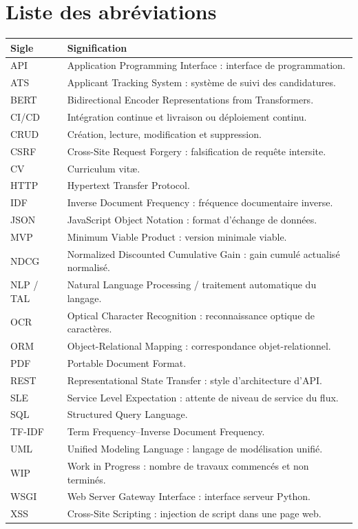 \chapter*{Liste des abréviations}
\begingroup
\small
{}
\begin{longtable}{@{}P{2.5cm}P{11.8cm}@{}}
\toprule\textbf{Sigle} & \textbf{Signification}\\\midrule\endhead
API & Application Programming Interface : interface de programmation.\\
ATS & Applicant Tracking System : système de suivi des candidatures.\\
BERT & Bidirectional Encoder Representations from Transformers.\\
CI/CD & Intégration continue et livraison ou déploiement continu.\\
CRUD & Création, lecture, modification et suppression.\\
CSRF & Cross-Site Request Forgery : falsification de requête intersite.\\
CV & Curriculum vitæ.\\
HTTP & Hypertext Transfer Protocol.\\
IDF & Inverse Document Frequency : fréquence documentaire inverse.\\
JSON & JavaScript Object Notation : format d'échange de données.\\
MVP & Minimum Viable Product : version minimale viable.\\
NDCG & Normalized Discounted Cumulative Gain : gain cumulé actualisé normalisé.\\
NLP / TAL & Natural Language Processing / traitement automatique du langage.\\
OCR & Optical Character Recognition : reconnaissance optique de caractères.\\
ORM & Object-Relational Mapping : correspondance objet-relationnel.\\
PDF & Portable Document Format.\\
REST & Representational State Transfer : style d'architecture d'API.\\
SLE & Service Level Expectation : attente de niveau de service du flux.\\
SQL & Structured Query Language.\\
TF-IDF & Term Frequency--Inverse Document Frequency.\\
UML & Unified Modeling Language : langage de modélisation unifié.\\
WIP & Work in Progress : nombre de travaux commencés et non terminés.\\
WSGI & Web Server Gateway Interface : interface serveur Python.\\
XSS & Cross-Site Scripting : injection de script dans une page web.\\
\bottomrule
\end{longtable}
\endgroup
